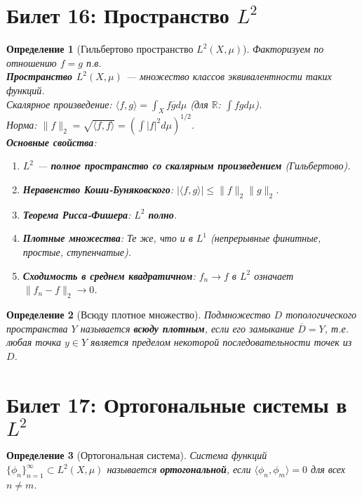 \documentclass[a4paper, 12pt]{article}
\newtheorem{definition}{Определение}
\newcommand{\R}{\mathbb{R}}
\newcommand{\1}{\mathbf{1}}
\begin{document}
\section*{Билет 16: Пространство $L^2$}
\begin{definition}[Гильбертово пространство $L^2(X, \mu)$]
    Факторизуем по отношению $f = g$ п.в. \\
    \textbf{Пространство $L^2(X, \mu)$} — множество классов эквивалентности таких функций. \\
    Скалярное произведение: $\langle f, g \rangle = \int_X f \overline{g}  d\mu$ (для $\R$: $\int f g  d\mu$). \\
    Норма: $\|f\|_2 = \sqrt{\langle f, f \rangle} = \left( \int |f|^2  d\mu \right)^{1/2}$. \\
    \textbf{Основные свойства}:
    \begin{enumerate}[label=(\arabic*)]
        \item $L^2$ — \textbf{полное пространство со скалярным произведением} (Гильбертово).
        \item \textbf{Неравенство Коши-Буняковского}: $|\langle f, g \rangle| \leq \|f\|_2 \|g\|_2$.
        \item \textbf{Теорема Рисса-Фишера}: $L^2$ \textbf{полно}.
        \item \textbf{Плотные множества}: Те же, что и в $L^1$ (непрерывные финитные, простые, ступенчатые).
        \item \textbf{Сходимость в среднем квадратичном}: $f_n \to f$ в $L^2$ означает $\|f_n - f\|_2 \to 0$.
    \end{enumerate}
\end{definition}

\begin{definition}[Всюду плотное множество]
    Подмножество $D$ топологического пространства $Y$ называется \textbf{всюду плотным}, если его замыкание $\overline{D} = Y$, т.е. любая точка $y \in Y$ является пределом некоторой последовательности точек из $D$.
\end{definition}

\section*{Билет 17: Ортогональные системы в $L^2$}
\begin{definition}[Ортогональная система]
    Система функций $\{\phi_n\}_{n=1}^{\infty} \subset L^2(X, \mu)$ называется \textbf{ортогональной}, если $\langle \phi_n, \phi_m \rangle = 0$ для всех $n \neq m$.
\end{definition}
\end{document}
